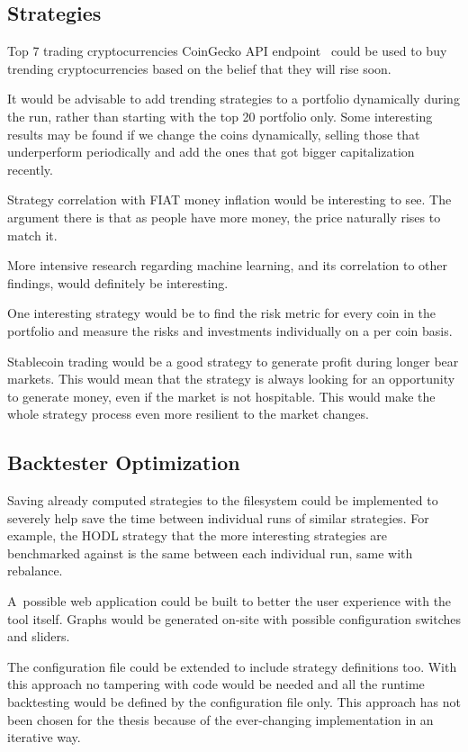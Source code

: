\subsection*{Strategies}
Top 7 trading cryptocurrencies CoinGecko API endpoint~\cite{coingecko:documentation} could be used to buy trending cryptocurrencies based on the belief that they will rise soon.

It would be advisable to add trending strategies to a portfolio dynamically during the run, rather than starting with the top 20 portfolio only. Some interesting results may be found if we change the coins dynamically, selling those that underperform periodically and add the ones that got bigger capitalization recently.

Strategy correlation with FIAT money inflation would be interesting to see. The argument there is that as people have more money, the price naturally rises to match it.

More intensive research regarding machine learning, and its correlation to other findings, would definitely be interesting.

One interesting strategy would be to find the risk metric for every coin in the portfolio and measure the risks and investments individually on a per coin basis.

Stablecoin trading would be a good strategy to generate profit during longer bear markets. This would mean that the strategy is always looking for an opportunity to generate money, even if the market is not hospitable. This would make the whole strategy process even more resilient to the market changes.

\subsection*{Backtester Optimization}
Saving already computed strategies to the filesystem could be implemented to severely help save the time between individual runs of similar strategies. For example, the HODL strategy that the more interesting strategies are benchmarked against is the same between each individual run, same with rebalance.

A~possible web application could be built to better the user experience with the tool itself. Graphs would be generated on-site with possible configuration switches and sliders.

The configuration file could be extended to include strategy definitions too. With this approach no tampering with code would be needed and all the runtime backtesting would be defined by the configuration file only. This approach has not been chosen for the thesis because of the ever-changing implementation in an iterative way.

